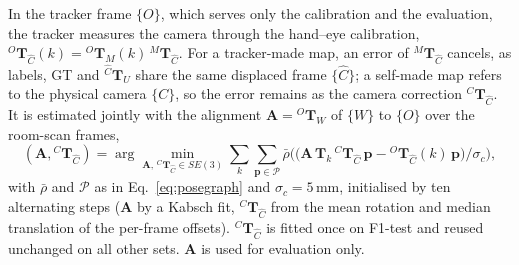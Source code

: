 \documentclass[9pt,shortpaper,twoside,web]{ieeecolor2}
\newcommand{\Tf}[2]{{}^{#1}\mathbf{T}_{#2}}
\newcommand{\Ch}{\hat{C}}%
\newcommand{\Tcorr}{\Tf{C}{\Ch}}%
\newcommand{\Ftest}{F1-test}
\begin{document}
In the tracker frame $\{O\}$, which serves only the calibration and the evaluation, the tracker measures the camera through the hand--eye calibration, $\Tf{O}{\Ch}(k)=\Tf{O}{M}(k)\,\Tf{M}{\Ch}$. For a tracker-made map, an error of $\Tf{M}{\Ch}$ cancels, as labels, GT and $\Tf{\Ch}{U}$ share the same displaced frame $\{\Ch\}$; a self-made map refers to the physical camera $\{C\}$, so the error remains as the camera correction $\Tcorr$. It is estimated jointly with the alignment $\mathbf{A}=\Tf{O}{W}$ of $\{W\}$ to $\{O\}$ over the room-scan frames,
\begin{equation}
  (\mathbf{A},\Tcorr)=\arg\min_{\mathbf{A},\,\Tcorr\in SE(3)}\sum_k\sum_{\mathbf{p}\in\mathcal{P}}\bar{\rho}\Big(\big(\mathbf{A}\,\mathbf{T}_k\,\Tcorr\,\mathbf{p}-\Tf{O}{\Ch}(k)\,\mathbf{p}\big)/\sigma_c\Big),
  \label{eq:calib}
\end{equation}
with $\bar{\rho}$ and $\mathcal{P}$ as in Eq.~\eqref{eq:posegraph} and $\sigma_c=5$\,mm, initialised by ten alternating steps ($\mathbf{A}$ by a Kabsch fit, $\Tcorr$ from the mean rotation and median translation of the per-frame offsets). $\Tcorr$ is fitted once on \Ftest{} and reused unchanged on all other sets. $\mathbf{A}$ is used for evaluation only.
 
\end{document}

